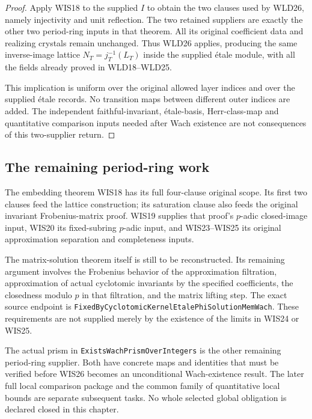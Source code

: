 \documentclass[11pt,a4paper]{article}
\numberwithin{equation}{section}
\theoremstyle{remark}\newtheorem{remark}[theorem]{Remark}
\begin{document}
\begin{proof}
Apply WIS18 to the supplied $I$ to obtain the two
clauses used by WLD26, namely injectivity and unit
reflection. The two retained suppliers are exactly
the other two period-ring inputs in that theorem.
All its original coefficient data and realizing
crystals remain unchanged. Thus WLD26 applies,
producing the same inverse-image lattice
$N_T=j_T^{-1}(L_T)$ inside the supplied
\'etale module, with all the fields already
proved in WLD18--WLD25.

This implication is uniform over the original
allowed layer indices and over the supplied
\'etale records. No transition maps between
different outer indices are added. The independent
faithful-invariant, \'etale-basis, Herr-class-map
and quantitative comparison inputs needed after
Wach existence are not consequences of this
two-supplier return.
\end{proof}

\subsection{The remaining period-ring work}

The embedding theorem WIS18 has its full four-clause original
scope. Its first two clauses feed the lattice construction;
its saturation clause also feeds the original invariant
Frobenius-matrix proof. WIS19 supplies that proof's
$p$-adic closed-image input, WIS20 its fixed-subring
$p$-adic input, and WIS23--WIS25 its original approximation
separation and completeness inputs.

The matrix-solution theorem itself is still to be reconstructed.
Its remaining argument involves the Frobenius behavior of the
approximation filtration, approximation of actual cyclotomic
invariants by the specified coefficients, the closedness
modulo $p$ in that filtration, and the matrix lifting step.
The exact source endpoint is
\texttt{Fixed\allowbreak By\allowbreak Cyclotomic\allowbreak Kernel\allowbreak Etale\allowbreak Phi\allowbreak Solution\allowbreak Mem\allowbreak Wach}.
These requirements are not supplied merely by the existence
of the limits in WIS24 or WIS25.

The actual prism in
\texttt{Exists\allowbreak Wach\allowbreak Prism\allowbreak Over\allowbreak Integers} is the other remaining
period-ring supplier. Both have concrete maps and identities
that must be verified before WIS26 becomes an unconditional
Wach-existence result. The later full local comparison package
and the common family of quantitative local bounds are
separate subsequent tasks. No whole selected global obligation
is declared closed in this chapter.



\endgroup
\end{document}
